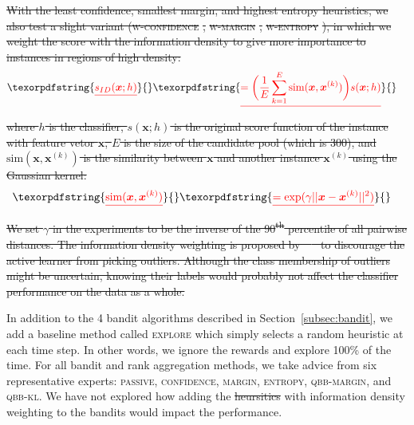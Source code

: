 \documentclass[fleqn,10pt,lineno]{wlpeerj} %
\providecommand{\DIFaddtex}[1]{{\protect\color{blue}\uwave{#1}}} %
\providecommand{\DIFdeltex}[1]{{\protect\color{red}\sout{#1}}}                      %
\providecommand{\DIFaddbegin}{} %
\providecommand{\DIFaddend}{} %
\providecommand{\DIFdelbegin}{} %
\providecommand{\DIFdelend}{} %
\providecommand{\DIFadd}[1]{\texorpdfstring{\DIFaddtex{#1}}{#1}} %
\providecommand{\DIFdel}[1]{\texorpdfstring{\DIFdeltex{#1}}{}} %
\begin{document}
\DIFdelbegin \DIFdel{With the least confidence, smallest margin, and highest entropy
heuristics, we also test a slight variant (}\textsc{\DIFdel{w-confidence}}%
\DIFdel{,
}\textsc{\DIFdel{w-margin}}%
\DIFdel{, }\textsc{\DIFdel{w-entropy}}%
\DIFdel{), in which we weight the score with the
information density to give more importance to instances in regions of high
density:
}\begin{eqnarray*}
	\DIFdel{s_{ID}(\bm{x}; h) }&\DIFdel{=
		\bigg(\dfrac{1}{E} \sum_{k = 1}^E
		\text{sim}(\bm{x}, \bm{x}^{(k)})\bigg) s(\bm{x}; h)
}\end{eqnarray*}
\DIFdel{where $h$ is the classifier, $s(\bm{x}; h)$ is the original score function of
the instance with feature vetor $\bm{x}$, $E$ is the size of the candidate pool
(which is 300), and $\text{sim}(\bm{x}, \bm{x}^{(k)})$ is the similarity
between $\bm{x}$ and another instance $\bm{x}^{(k)}$ using the Gaussian kernel:
}\begin{eqnarray*}
	\DIFdel{\text{sim}(\bm{x}, \bm{x}^{(k)})
		}&\DIFdel{= \exp(\gamma ||\bm{x} - \bm{x}^{(k)}||^2)
}\end{eqnarray*}
\DIFdel{We set $\gamma$ in the experiments to be the inverse of the
90\textsuperscript{th} percentile of all pairwise distances. The information
density weighting is proposed by~\mbox{%
\cite{settles08} }\hspace{0pt}%
to discourage the active
learner from picking outliers. Although the class membership of outliers might
be uncertain, knowing their labels would probably not affect the classifier
performance on the data as a whole.
}%

\DIFdelend In addition to the 4 bandit algorithms described in
Section~\ref{subsec:bandit}, we add a baseline method called \textsc{explore}
which simply selects a random heuristic at each time step. In other words, we
ignore the rewards and explore 100\% of the time. For all bandit and rank
aggregation methods, we take advice from six representative experts:
\textsc{passive}, \textsc{confidence}, \textsc{margin}, \textsc{entropy},
\textsc{qbb-margin}, and \textsc{qbb-kl}. We have not explored how adding the
\DIFdelbegin \DIFdel{heursitics }\DIFdelend \DIFaddbegin \DIFadd{heuristics }\DIFaddend with information density weighting to the bandits would impact
the performance.
\end{document}
